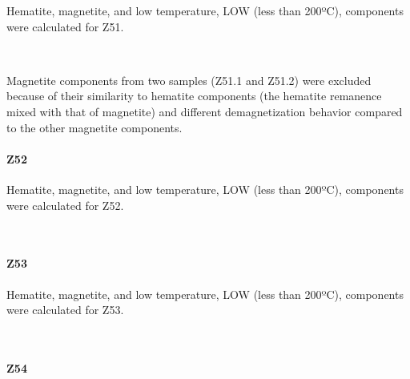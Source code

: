 \documentclass[11pt]{article}
\begin{document}
    Hematite, magnetite, and low temperature, LOW (less than 200ºC),
components were calculated for Z51.



    \begin{center}
    \end{center}
    { \hspace*{\fill} \\}
    
    Magnetite components from two samples (Z51.1 and Z51.2) were excluded
because of their similarity to hematite components (the hematite
remanence mixed with that of magnetite) and different demagnetization
behavior compared to the other magnetite components.

    \paragraph{Z52}\label{z52}

    Hematite, magnetite, and low temperature, LOW (less than 200ºC),
components were calculated for Z52.



    \begin{center}
    \end{center}
    { \hspace*{\fill} \\}
    
    \paragraph{Z53}\label{z53}

    Hematite, magnetite, and low temperature, LOW (less than 200ºC),
components were calculated for Z53.



    \begin{center}
    \end{center}
    { \hspace*{\fill} \\}
    
    \paragraph{Z54}\label{z54}
\end{document}
